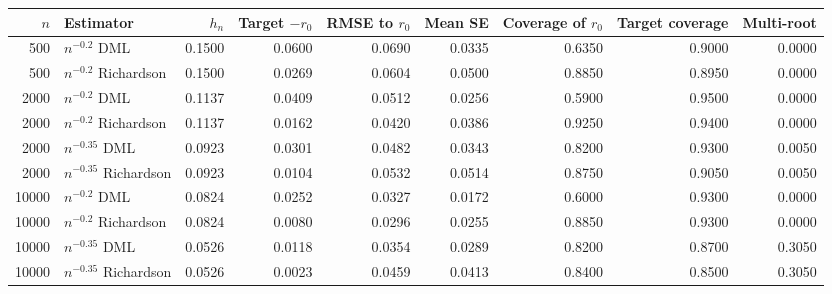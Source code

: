 \begin{tabular}{rlrrrrrrr}
\toprule
$n$ & Estimator & $h_n$ & Target $-r_0$ & RMSE to $r_0$ & Mean SE & Coverage of $r_0$ & Target coverage & Multi-root \\
\midrule
500 & $n^{-0.2}$ DML & 0.1500 & 0.0600 & 0.0690 & 0.0335 & 0.6350 & 0.9000 & 0.0000 \\
500 & $n^{-0.2}$ Richardson & 0.1500 & 0.0269 & 0.0604 & 0.0500 & 0.8850 & 0.8950 & 0.0000 \\
2000 & $n^{-0.2}$ DML & 0.1137 & 0.0409 & 0.0512 & 0.0256 & 0.5900 & 0.9500 & 0.0000 \\
2000 & $n^{-0.2}$ Richardson & 0.1137 & 0.0162 & 0.0420 & 0.0386 & 0.9250 & 0.9400 & 0.0000 \\
2000 & $n^{-0.35}$ DML & 0.0923 & 0.0301 & 0.0482 & 0.0343 & 0.8200 & 0.9300 & 0.0050 \\
2000 & $n^{-0.35}$ Richardson & 0.0923 & 0.0104 & 0.0532 & 0.0514 & 0.8750 & 0.9050 & 0.0050 \\
10000 & $n^{-0.2}$ DML & 0.0824 & 0.0252 & 0.0327 & 0.0172 & 0.6000 & 0.9300 & 0.0000 \\
10000 & $n^{-0.2}$ Richardson & 0.0824 & 0.0080 & 0.0296 & 0.0255 & 0.8850 & 0.9300 & 0.0000 \\
10000 & $n^{-0.35}$ DML & 0.0526 & 0.0118 & 0.0354 & 0.0289 & 0.8200 & 0.8700 & 0.3050 \\
10000 & $n^{-0.35}$ Richardson & 0.0526 & 0.0023 & 0.0459 & 0.0413 & 0.8400 & 0.8500 & 0.3050 \\
\bottomrule
\end{tabular}

